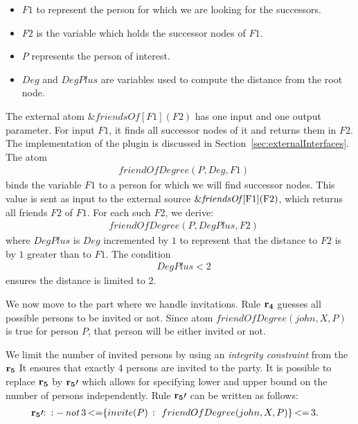 \documentclass[a4paper, titlepage]{article}
\newcommand{\ext}[3]{\ensuremath{\&{#1}[#2](#3)}}
\DeclareMathOperator{\leftimpl}{:-}
\DeclareMathOperator{\nott}{\mathit{not}}
\DeclareMathOperator{\lesseq}{<=}
\newcommand{\row}[1]{%
  \ensuremath{\color{black}\ensuremath{\mathbf{#1}} \color{black}}%
}
\newcommand{\rowprefixprime}[1]{%
  \ensuremath{\color{black}\mathbf{#1\prime{:}}\ }%
}
\begin{document}
\begin{itemize}
\item $\mathit{F1}$ to represent the person for which we are 
looking for the successors.

\item $\mathit{F2}$ is the variable which holds the successor 
nodes of $F1$. 

\item $P$ represents the person of interest.

\item $\mathit{Deg}$ and $DegPlus$ are variables used to 
compute the distance from the root node.
\end{itemize}
The external atom \ext{friendsOf}{F1}{F2} has one input and 
one output parameter. For input $\mathit{F1}$, 
it finds all successor nodes of it and returns them in 
$\mathit{F2}$. The implementation of the plugin is 
discussed in Section~\ref{sec:externalInterfaces}. The atom
\begin{align*}
& \mathit{friendOfDegree(P, Deg, F1)}
\end{align*}
binds the variable $\mathit{F1}$ to a person for which we 
will find successor nodes. This value is sent as input to 
the external source \ext{\mathit{friendsOf}}{$F1$}{$F2$}, 
which returns all friends $F2$ of $F1$. For each such $F2$, 
we derive:
\begin{align*}
& \mathit{friendOfDegree(P, DegPlus, F2)}
\end{align*} 
where $\mathit{DegPlus}$ is $\mathit{Deg}$ incremented by 
$1$ to represent that the distance to $F2$ is by $1$ 
greater than to $F1$. The condition
\begin{align*}
& \mathit{DegPlus < 2}
\end{align*}
ensures the distance is limited to 2. 

We now move to the part where we handle invitations. Rule $\row{r_4}$ guesses all possible 
persons to be invited or not. Since atom 
$\mathit{friendOfDegree(john, X, P)}$ is true for person $P$, that person will be either invited or not.

We limit the number of invited persons by using an 
\emph{integrity constraint} from the $\row{r_5}$
It ensures that exactly 4 persons are invited to the party. 
It is possible to replace $\row{r_5}$ by $\row{r_5} \prime $ which allows for specifying 
lower and upper bound on the number of persons independently. Rule $\row{r_5} \prime $ can be written as follows:
\begin{align*}
\rowprefixprime{r_5} \leftimpl \nott \thinspace & 3 \lesseq \{ invite(P) \ \colon \ friendOfDegree(john,X,P)\} \lesseq 3.
\end{align*} 
  
\end{document}
